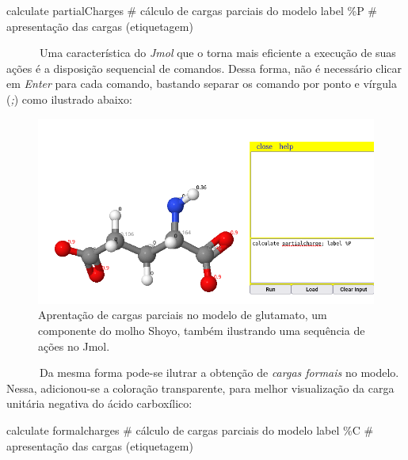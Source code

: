 \documentclass[
  letterpaper,
  DIV=11,
  numbers=noendperiod]{scrreprt}
\newenvironment{Shaded}{\begin{snugshade}}{\end{snugshade}}
\newcommand{\CommentTok}[1]{\textcolor[rgb]{0.37,0.37,0.37}{#1}}
\newcommand{\NormalTok}[1]{\textcolor[rgb]{0.00,0.23,0.31}{#1}}
\begin{document}
\begin{Shaded}
\begin{Highlighting}[]
\NormalTok{calculate partialCharges }\CommentTok{\# cálculo de cargas parciais do modelo}
\NormalTok{label \%P }\CommentTok{\# apresentação das cargas (etiquetagem)}
\end{Highlighting}
\end{Shaded}

~~~~~~Uma característica do \emph{Jmol} que o torna mais eficiente a
execução de suas ações é a disposição sequencial de comandos. Dessa
forma, não é necessário clicar em \emph{Enter} para cada comando,
bastando separar os comando por ponto e vírgula (\emph{;}) como
ilustrado abaixo:

\begin{figure}[H]

{\centering \includegraphics{glu.png}

}

\caption{Aprentação de cargas parciais no modelo de glutamato, um
componente do molho Shoyo, também ilustrando uma sequência de ações no
Jmol.}

\end{figure}%

~~~~~~Da mesma forma pode-se ilutrar a obtenção de \emph{cargas formais}
no modelo. Nessa, adicionou-se a coloração transparente, para melhor
visualização da carga unitária negativa do ácido carboxílico:

\begin{Shaded}
\begin{Highlighting}[]
\NormalTok{calculate formalcharges }\CommentTok{\# cálculo de cargas parciais do modelo}
\NormalTok{label \%C }\CommentTok{\# apresentação das cargas (etiquetagem)}
\end{Highlighting}
\end{Shaded}
\end{document}
